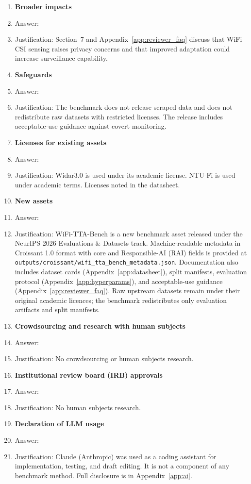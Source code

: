 \begin{enumerate}
\item {\bf Broader impacts}
    \item[] Answer: \answerYes{}
    \item[] Justification: Section~7 and Appendix~\ref{app:reviewer_faq} discuss that WiFi CSI sensing raises privacy concerns and that improved adaptation could increase surveillance capability.

\item {\bf Safeguards}
    \item[] Answer: \answerNA{}
    \item[] Justification: The benchmark does not release scraped data and does not redistribute raw datasets with restricted licenses. The release includes acceptable-use guidance against covert monitoring.

\item {\bf Licenses for existing assets}
    \item[] Answer: \answerYes{}
    \item[] Justification: Widar3.0 is used under its academic license. NTU-Fi is used under academic terms. Licenses noted in the datasheet.

\item {\bf New assets}
    \item[] Answer: \answerYes{}
    \item[] Justification: WiFi-TTA-Bench is a new benchmark asset released under the NeurIPS 2026 Evaluations \& Datasets track. Machine-readable metadata in Croissant 1.0 format with core and Responsible-AI (RAI) fields is provided at \texttt{outputs/croissant/wifi\_tta\_bench\_metadata.json}. Documentation also includes dataset cards (Appendix~\ref{app:datasheet}), split manifests, evaluation protocol (Appendix~\ref{app:hyperparams}), and acceptable-use guidance (Appendix~\ref{app:reviewer_faq}). Raw upstream datasets remain under their original academic licences; the benchmark redistributes only evaluation artifacts and split manifests.

\item {\bf Crowdsourcing and research with human subjects}
    \item[] Answer: \answerNA{}
    \item[] Justification: No crowdsourcing or human subjects research.

\item {\bf Institutional review board (IRB) approvals}
    \item[] Answer: \answerNA{}
    \item[] Justification: No human subjects research.

\item {\bf Declaration of LLM usage}
    \item[] Answer: \answerYes{}
    \item[] Justification: Claude (Anthropic) was used as a coding assistant for implementation, testing, and draft editing. It is not a component of any benchmark method. Full disclosure is in Appendix~\ref{app:ai}.

\end{enumerate}
